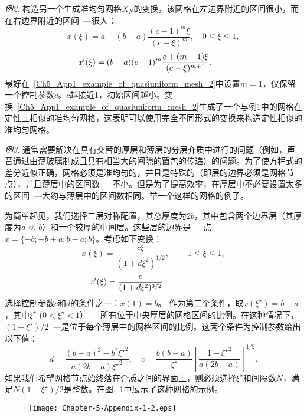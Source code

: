 \documentclass[twoside]{book}
\begin{document}
\begin{CJK*}{GBK}{song}
\bigskip
\emph{例2.} 构造另一个生成准均匀网格$X_N$的变换，该网格在左边界附近的区间很小，而在右边界附近的区间~---很大：
\begin{equation}
    \label{Ch5_App1_example_of_quasiuniform_mesh_2}
    x(\xi) = a + (b - a)\dfrac{(c - 1)^m \xi}{(c - \xi)^m}, \quad 0 \leqslant \xi \leqslant 1,
\end{equation}
\begin{equation*}
    \hspace{-0.7cm}
    x'(\xi) = (b - a)(c - 1)^m\dfrac{c + (m - 1) \xi}{(c - \xi)^{m + 1}}.
\end{equation*}
最好在~\eqref{Ch5_App1_example_of_quasiuniform_mesh_2}中设置$m = 1$，仅保留一个控制参数$c$。$c$越接近1，初始区间越小。变换~\eqref{Ch5_App1_example_of_quasiuniform_mesh_2}生成了一个与例1中的网格在定性上相似的准均匀网格，这表明可以使用完全不同形式的变换来构造定性相似的准均匀网格。

\bigskip
\emph{例3.} 通常需要解决在具有交替的厚层和薄层的分层介质中进行的问题（例如，声音通过由薄玻璃制成且具有相当大的间隙的窗包的传递）的问题。为了使方程式的差分近似正确，网格必须是准均匀的，并且是特殊的（即层的边界必须是网格节点），并且薄层中的区间数~---不小。但是为了提高效率，在厚层中不必要设置太多的区间~---大约与薄层中的区间数相同。举一个这样的网格的例子。

为简单起见，我们选择三层对称配置，其总厚度为$2b$，其中包含两个边界层（其厚度为$a \ll b$）和一个较厚的中间层。这些层的边界是~---点$x = \{-b; -b + a; b - a; b\}$。考虑如下变换：
\begin{equation}
    \label{Ch5_App1_example_of_quasiuniform_mesh_3}
    x(\xi) = \dfrac{c\xi}{(1 + d\xi^2)^{1/2}}, \quad -1 \leqslant \xi \leqslant 1,
\end{equation}
\begin{equation*}
    \hspace{-2.2cm}
    x'(\xi) = \dfrac{c}{(1 + d\xi^2)^{3/2}}.
\end{equation*}
选择控制参数$c$和$d$的条件之一：$x(1) = b$。 作为第二个条件，取$x(\xi^\star) = b - a$，其中$\xi^\star$ ($0 < \xi^\star < 1$）~---所有位于中央厚层的网格区间的比例。在这种情况下，$(1 - \xi^\star)/2$~---是位于每个薄层中的网格区间的比例。这两个条件为控制参数给出以下值：
\begin{equation*}
    d = \dfrac{(b - a)^2 - b^2 {\xi^\star}^2}{a(2b - a){\xi^\star}^2}, \quad c = \dfrac{b(b - a)}{\xi^\star}\left[\dfrac{1 - {\xi^\star}^2}{a(2b - a)}\right]^{1/2}.
\end{equation*}
如果我们希望网格节点始终落在介质之间的界面上，则必须选择$\xi^\star$和间隔数$N$，满足$N(1 - \xi^\star)/2$是整数。在图.~\ref{Fig_5_App1_2}中展示了这种网格的示例。
\begin{figure}[t]
    \centering
    \texttt{[image: Chapter-5-Appendix-1-2.eps]}\\
    \label{Fig_5_App1_2}
\end{figure}


\end{CJK*}
\end{document}
